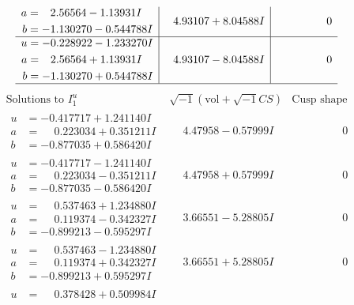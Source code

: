 \documentclass[1p]{elsarticle_modified}
\theoremstyle{definition}
\newcommand{\I}{\sqrt{-1}}
\begin{document}
$$\begin{array}{c|c|c}
\begin{aligned}
a &= \phantom{-}2.56564 - 1.13931 I \\
b &= -1.130270 - 0.544788 I\end{aligned}
 & \phantom{-}4.93107 + 8.04588 I & \phantom{-0.000000 } 0 \\ \hline\begin{aligned}
u &= -0.228922 - 1.233270 I \\
a &= \phantom{-}2.56564 + 1.13931 I \\
b &= -1.130270 + 0.544788 I\end{aligned}
 & \phantom{-}4.93107 - 8.04588 I & \phantom{-0.000000 } 0\\
 \hline 
 \end{array}$$\newpage$$\begin{array}{c|c|c}  
\text{Solutions to }I^u_{1}& \I (\text{vol} + \sqrt{-1}CS) & \text{Cusp shape}\\
 \hline 
\begin{aligned}
u &= -0.417717 + 1.241140 I \\
a &= \phantom{-}0.223034 + 0.351211 I \\
b &= -0.877035 + 0.586420 I\end{aligned}
 & \phantom{-}4.47958 - 0.57999 I & \phantom{-0.000000 } 0 \\ \hline\begin{aligned}
u &= -0.417717 - 1.241140 I \\
a &= \phantom{-}0.223034 - 0.351211 I \\
b &= -0.877035 - 0.586420 I\end{aligned}
 & \phantom{-}4.47958 + 0.57999 I & \phantom{-0.000000 } 0 \\ \hline\begin{aligned}
u &= \phantom{-}0.537463 + 1.234880 I \\
a &= \phantom{-}0.119374 - 0.342327 I \\
b &= -0.899213 - 0.595297 I\end{aligned}
 & \phantom{-}3.66551 - 5.28805 I & \phantom{-0.000000 } 0 \\ \hline\begin{aligned}
u &= \phantom{-}0.537463 - 1.234880 I \\
a &= \phantom{-}0.119374 + 0.342327 I \\
b &= -0.899213 + 0.595297 I\end{aligned}
 & \phantom{-}3.66551 + 5.28805 I & \phantom{-0.000000 } 0 \\ \hline\begin{aligned}
u &= \phantom{-}0.378428 + 0.509984 I \\

\end{aligned}
\end{array}$$
\end{document}
